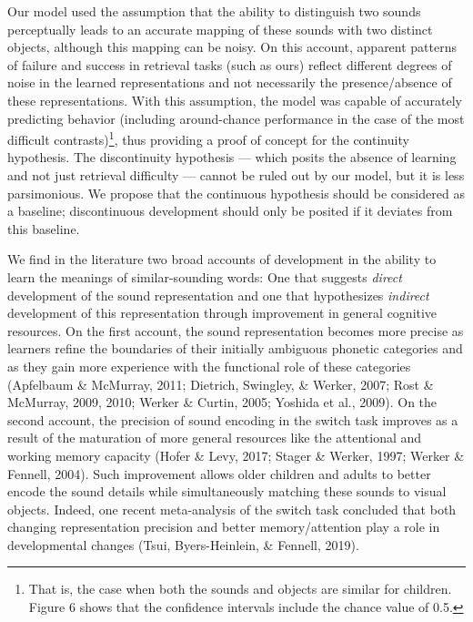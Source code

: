\documentclass[english,,man]{apa6}
\let\rmarkdownfootnote\footnote%
\def\footnote{\protect\rmarkdownfootnote}
\begin{document}
Our model used the assumption that the ability to distinguish two sounds perceptually leads to an accurate mapping of these sounds with two distinct objects, although this mapping can be noisy. On this account, apparent patterns of failure and success in retrieval tasks (such as ours) reflect different degrees of noise in the learned representations and not necessarily the presence/absence of these representations. With this assumption, the model was capable of accurately predicting behavior (including around-chance performance in the case of the most difficult contrasts)\footnote{That is, the case when both the sounds and objects are similar for children. Figure 6 shows that the confidence intervals include the chance value of 0.5.}, thus providing a proof of concept for the continuity hypothesis. The discontinuity hypothesis --- which posits the absence of learning and not just retrieval difficulty --- cannot be ruled out by our model, but it is less parsimonious. We propose that the continuous hypothesis should be considered as a baseline; discontinuous development should only be posited if it deviates from this baseline.

We find in the literature two broad accounts of development in the ability to learn the meanings of similar-sounding words: One that suggests \emph{direct} development of the sound representation and one that hypothesizes \emph{indirect} development of this representation through improvement in general cognitive resources. On the first account, the sound representation becomes more precise as learners refine the boundaries of their initially ambiguous phonetic categories and as they gain more experience with the functional role of these categories (Apfelbaum \& McMurray, 2011; Dietrich, Swingley, \& Werker, 2007; Rost \& McMurray, 2009, 2010; Werker \& Curtin, 2005; Yoshida et al., 2009). On the second account, the precision of sound encoding in the switch task improves as a result of the maturation of more general resources like the attentional and working memory capacity (Hofer \& Levy, 2017; Stager \& Werker, 1997; Werker \& Fennell, 2004). Such improvement allows older children and adults to better encode the sound details while simultaneously matching these sounds to visual objects. Indeed, one recent meta-analysis of the switch task concluded that both changing representation precision and better memory/attention play a role in developmental changes (Tsui, Byers-Heinlein, \& Fennell, 2019).
\end{document}
